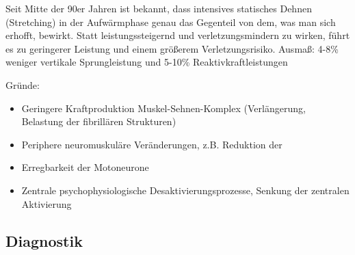 Seit Mitte der 90er Jahren ist bekannt, dass intensives statisches Dehnen (Stretching) in der Aufwärmphase genau das Gegenteil von dem, was man sich erhofft, bewirkt.
Statt leistungssteigernd und verletzungsmindern zu wirken, führt es zu geringerer Leistung und einem größerem Verletzungsrisiko. Ausmaß: 4-8\% weniger vertikale Sprungleistung und 5-10\% Reaktivkraftleistungen

Gründe:
\begin{itemize}
    \item Geringere Kraftproduktion Muskel-Sehnen-Komplex (Verlängerung, Belastung der fibrillären Strukturen)
    \item Periphere neuromuskuläre Veränderungen, z.B. Reduktion der
    \item Erregbarkeit der Motoneurone
    \item Zentrale psychophysiologische Desaktivierungsprozesse, Senkung der zentralen Aktivierung
\end{itemize}

\subsection{Diagnostik}
